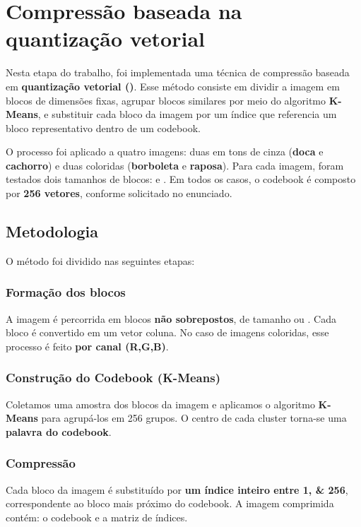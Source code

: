 \documentclass[../main.tex]{subfiles}
\begin{document}
\section{Compressão baseada na quantização vetorial}
Nesta etapa do trabalho, foi implementada uma técnica de compressão baseada em \textbf{quantização vetorial (\vq)}. Esse método consiste em dividir a imagem em blocos de dimensões fixas, agrupar blocos similares por meio do algoritmo \textbf{K-Means}, e substituir cada bloco da imagem por um índice que referencia um bloco representativo dentro de um codebook.

O processo foi aplicado a quatro imagens: duas em tons de cinza (\textbf{doca} e \textbf{cachorro}) e duas coloridas (\textbf{borboleta} e \textbf{raposa}). Para cada imagem, foram testados dois tamanhos de blocos: \textbf{} e \textbf{}. Em todos os casos, o codebook é composto por \textbf{\num{256} vetores}, conforme solicitado no enunciado. 

\subsection{Metodologia}
O método foi dividido nas seguintes etapas:

\subsubsection{Formação dos blocos}
A imagem é percorrida em blocos \textbf{não sobrepostos}, de tamanho  ou . Cada bloco é convertido em um vetor coluna. No caso de imagens coloridas, esse processo é feito \textbf{por canal (R,G,B)}.

\subsubsection{Construção do Codebook (K-Means)}
Coletamos uma amostra dos blocos da imagem e aplicamos o algoritmo \textbf{K-Means} para agrupá-los em \num{256} grupos. O centro de cada cluster torna-se uma \textbf{palavra do codebook}.

\subsubsection{Compressão}
Cada bloco da imagem é substituído por \textbf{um índice inteiro entre \numlist{1;256}}, correspondente ao bloco mais próximo do codebook. A imagem comprimida contém: o codebook e a matriz de índices.
\end{document}
